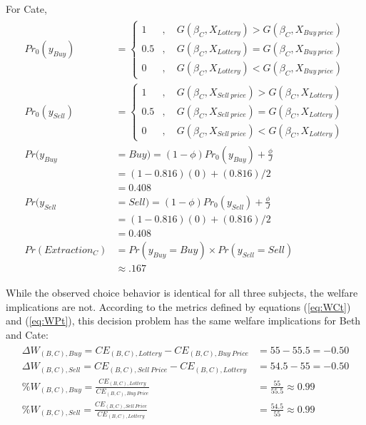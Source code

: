 \documentclass[11pt,a4paper]{article}
\newcommand\CE{\ensuremath{\mathit{CE}}}  %
\newcommand\Prob{\ensuremath{\mathit{Pr}}}  %
\begin{document}
\noindent For Cate,
\begin{align}
	\label{eq:Cate}
	\begin{split}
		{\Prob}_0(y_{\mathit{Buy}}) &=
		\begin{cases} 
			1 &, \quad G(\beta_C,X_{\mathit{Lottery}}) > G(\beta_C,X_{\mathit{Buy\ price}})\\
			0.5 &, \quad G(\beta_C,X_{\mathit{Lottery}}) = G(\beta_C,X_{\mathit{Buy\ price}})\\
			0 &, \quad G(\beta_C,X_{\mathit{Lottery}}) < G(\beta_C,X_{\mathit{Buy\ price}})
		\end{cases} \\
		{\Prob}_0(y_{\mathit{Sell}}) &= 
		\begin{cases} 
			1 &, \quad G(\beta_C,X_{\mathit{Sell\ price}}) > G(\beta_C,X_{\mathit{Lottery}})\\
			0.5 &, \quad G(\beta_C,X_{\mathit{Sell\ price}}) = G(\beta_C,X_{\mathit{Lottery}})\\
			0 &, \quad G(\beta_C,X_{\mathit{Sell\ price}}) < G(\beta_C,X_{\mathit{Lottery}})
		\end{cases}\\
		{\Prob}(y_{\mathit{Buy}}&=\mathit{Buy}) = (1-\phi) {\Prob}_0(y_{\mathit{Buy}}) + \frac{\phi}{J}\\
		&=(1-0.816)(0) + (0.816)/2\\
		&=0.408\\
		{\Prob}(y_{\mathit{Sell}}&=\mathit{Sell}) = (1-\phi) {\Prob}_0(y_{\mathit{Sell}}) + \frac{\phi}{J}\\
		&=(1-0.816)(0) + (0.816)/2\\
		&=0.408\\
	{\Prob}(\mathit{Extraction}_C) &= {\Prob}(y_{\mathit{Buy}} = \mathit{Buy}) \times {\Prob}(y_{\mathit{Sell}} = \mathit{Sell})\\
	&\approx .167
	\end{split}
\end{align}

While the observed choice behavior is identical for all three subjects, the welfare implications are not.
According to the metrics defined by equations (\ref{eq:WCt}) and (\ref{eq:WPt}), this decision problem has the same welfare implications for Beth and Cate:
\begin{align}
	\label{eq:BCwelfare}
	\begin{split}
		\Delta W_{(B,C),\mathit{Buy}} = {\CE}_{(B,C),\mathit{Lottery}} - {\CE}_{(B,C),\mathit{Buy\ Price}} &= 55 - 55.5 = -0.50\\
		\Delta W_{(B,C),\mathit{Sell}} = {\CE}_{(B,C),\mathit{Sell\ Price}} - {\CE}_{(B,C),\mathit{Lottery}} &= 54.5 - 55 = -0.50\\
		\% W_{(B,C),\mathit{Buy}} = \frac{{\CE}_{(B,C),\mathit{Lottery}}}{{\CE}_{(B,C),\mathit{Buy\ Price}}} &= \frac{55}{55.5} \approx 0.99\\
		\% W_{(B,C),\mathit{Sell}} = \frac{{\CE}_{(B,C),\mathit{Sell\ Price}}}{{\CE}_{(B,C),\mathit{Lottery}}} &= \frac{54.5}{55} \approx 0.99
	\end{split}
\end{align}
\end{document}
